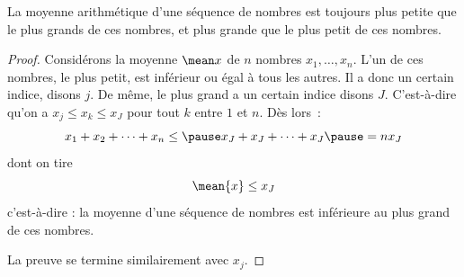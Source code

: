 \documentclass[french,xcolor=svgnames]{beamer}
\begin{document}
\begin{frame}
  \begin{property}
    La moyenne arithmétique d'une séquence de nombres\pause{} est toujours plus petite que le plus grands de ces nombres,\pause{} et plus grande que le plus petit de ces nombres.
  \end{property}
  \begin{proof}
    Considérons la moyenne \(\mean x\) de \(n\) nombres \(x_{1}, \ldots, x_{n}\).\pause{}
    L'un de ces nombres, \og le plus petit\fg{}, est inférieur ou égal à tous les autres.\pause{}
    Il a donc un certain indice, disons \(j\).\pause{}
    De même, le plus grand a un certain indice disons \(J\).\pause{}
    C'est-à-dire qu'on a \(x_{j} \leq x_{k} \leq x_{J}\) pour tout \(k\) entre \(1\) et \(n\).\pause{}
    Dès lors~:\pause{}
    \begin{equation*}
      x_{1} + x_{2} + \cdots + x_{n} \leq\pause x_{J} + x_{J} + \cdots + x_{J}\pause = n x_{J}
    \end{equation*}\pause{}
    dont on tire\pause{}
    \begin{equation*}
      \mean{x} \leq x_{J}
    \end{equation*}
    c'est-à-dire\pause{} : la moyenne d'une séquence de nombres est inférieure au plus grand de ces nombres.

    La preuve se termine similairement avec \(x_{j}\).
  \end{proof}
\end{frame}
\end{document}
